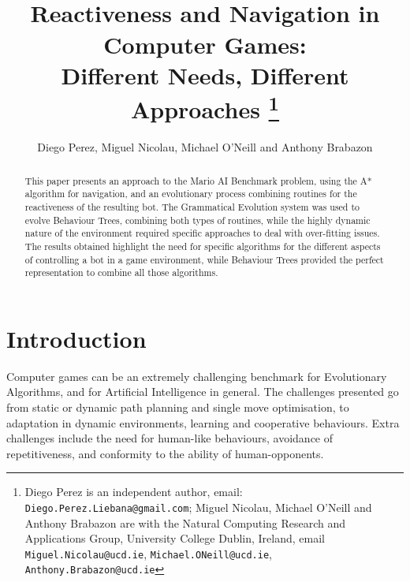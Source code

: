 \documentclass[conference]{IEEEtran}
\begin{document}
\title{\ \\ \LARGE\bf Reactiveness and Navigation in Computer Games:\\ Different Needs, Different Approaches \thanks{Diego Perez is an independent author, email: {\tt Diego.Perez.Liebana@gmail.com}; Miguel Nicolau, Michael O'Neill and Anthony Brabazon are with the Natural Computing Research and Applications Group, University College Dublin, Ireland, email {\tt Miguel.Nicolau@ucd.ie}, {\tt Michael.ONeill@ucd.ie}, {\tt Anthony.Brabazon@ucd.ie}}}


\author{Diego Perez, Miguel Nicolau, Michael O'Neill and Anthony Brabazon}


\maketitle

\begin{abstract}
This paper presents an approach to the Mario AI Benchmark problem, using
the A* algorithm for navigation, and an evolutionary process combining
routines for the reactiveness of the resulting bot. The Grammatical
Evolution system was used to evolve Behaviour Trees, combining both types of
routines, while the highly dynamic nature of the environment required specific
approaches to deal with over-fitting issues. The results obtained highlight
the need for specific algorithms for the different aspects of controlling a bot
in a game environment, while Behaviour Trees provided the perfect
representation to combine all those algorithms.
\end{abstract}

\section{Introduction} \label{sec:intro}

Computer games can be an extremely challenging benchmark for Evolutionary
Algorithms, and for Artificial Intelligence in general. The challenges
presented go from static or dynamic path planning and single move optimisation, to
adaptation in dynamic environments, learning and cooperative behaviours. Extra
challenges include the need for human-like behaviours, avoidance of
repetitiveness, and conformity to the ability of human-opponents.
\end{document}
